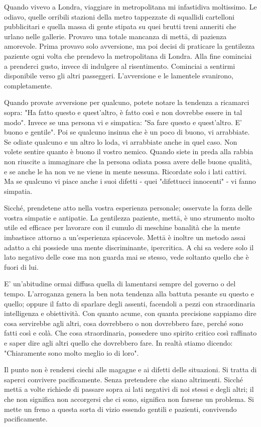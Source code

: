 Quando vivevo a Londra, viaggiare in metropolitana mi infastidiva
moltissimo. Le odiavo, quelle orribili stazioni della metro tappezzate
di squallidi cartelloni pubblicitari e quella massa di gente stipata su
quei brutti treni anneriti che urlano nelle gallerie. Provavo una totale
mancanza di mettā, di pazienza amorevole. Prima provavo solo avversione,
ma poi decisi di praticare la gentilezza paziente ogni volta che
prendevo la metropolitana di Londra. Alla fine cominciai a prenderci
gusto, invece di indulgere al risentimento. Cominciai a sentirmi
disponibile verso gli altri passeggeri. L'avversione e le lamentele
svanirono, completamente.

Quando provate avversione per qualcuno, potete notare la tendenza a
ricamarci sopra: "Ha fatto questo e quest'altro, è fatto così e non
dovrebbe essere in tal modo". Invece se una persona vi e simpatica: "Sa
fare questo e quest'altro. E' buono e gentile". Poi se qualcuno insinua
che è un poco di buono, vi arrabbiate. Se odiate qualcuno e un altro lo
loda, vi arrabbiate anche in quel caso. Non volete sentire quanto è
buono il vostro nemico. Quando siete in preda alla rabbia non riuscite a
immaginare che la persona odiata possa avere delle buone qualità, e se
anche le ha non ve ne viene in mente nessuna. Ricordate solo i lati
cattivi. Ma se qualcuno vi piace anche i suoi difetti - quei "difettucci
innocenti" - vi fanno simpatia.

Sicché, prendetene atto nella vostra esperienza personale; osservate la
forza delle vostra simpatie e antipatie. La gentilezza paziente, mettā,
è uno strumento molto utile ed efficace per lavorare con il cumulo di
meschine banalità che la mente imbastisce attorno a un'esperienza
spiacevole. Mettā è inoltre un metodo assai adatto a chi possiede una
mente discriminante, ipercritica. A chi sa vedere solo il lato negativo
delle cose ma non guarda mai se stesso, vede soltanto quello che è fuori
di lui.

E' un'abitudine ormai diffusa quella di lamentarsi sempre del governo o
del tempo. L'arroganza genera la ben nota tendenza alla battuta pesante
su questo e quello; oppure il fatto di sparlare degli assenti, facendoli
a pezzi con straordinaria intelligenza e obiettività. Con quanto acume,
con quanta precisione sappiamo dire cosa servirebbe agli altri, cosa
dovrebbero o non dovrebbero fare, perché sono fatti così e colà. Che
cosa straordinaria, possedere uno spirito critico così raffinato e saper
dire agli altri quello che dovrebbero fare. In realtà stiamo dicendo:
"Chiaramente sono molto meglio io di loro".

Il punto non è rendersi ciechi alle magagne e ai difetti delle
situazioni. Si tratta di saperci convivere pacificamente. Senza
pretendere che siano altrimenti. Sicché mettā a volte richiede di
passare sopra ai lati negativi di noi stessi e degli altri; il che non
significa non accorgersi che ci sono, significa non farsene un problema.
Si mette un freno a questa sorta di vizio essendo gentili e pazienti,
convivendo pacificamente.

